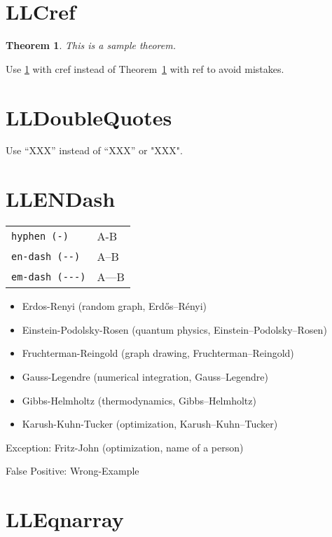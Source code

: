 \documentclass[a4paper]{article}
\newtheorem{theorem}{Theorem}
\begin{document}
\section{LLCref}

\begin{theorem}\label{thm:sample}
	This is a sample theorem.
\end{theorem}

Use \cref{thm:sample} with cref instead of Theorem~\ref{thm:sample} with ref to avoid mistakes.

\section{LLDoubleQuotes}

Use ``XXX'' instead of “XXX” or "XXX".

\section{LLENDash}

\begin{table}[H]
	\centering
	\begin{tabular}{ll}
		\verb|hyphen (-)|    & A-B   \\
		\verb|en-dash (--)|  & A--B  \\
		\verb|em-dash (---)| & A---B
	\end{tabular}
\end{table}

\begin{itemize}
	\item Erdos-Renyi (random graph, Erd\H{o}s--R\'enyi)
	\item Einstein-Podolsky-Rosen (quantum physics, Einstein--Podolsky--Rosen)
	\item Fruchterman-Reingold (graph drawing, Fruchterman--Reingold)
	\item Gauss-Legendre (numerical integration, Gauss--Legendre)
	\item Gibbs-Helmholtz (thermodynamics, Gibbs--Helmholtz)
	\item Karush-Kuhn-Tucker (optimization, Karush--Kuhn--Tucker)
\end{itemize}

Exception: Fritz-John (optimization, name of a person)

False Positive: Wrong-Example

\section{LLEqnarray}
\end{document}
